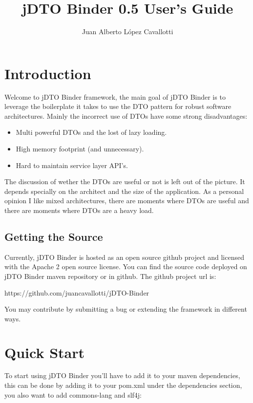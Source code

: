 \documentclass[11pt]{article}
\title{jDTO Binder 0.5 User's Guide}
\author{Juan Alberto López Cavallotti}
\newcommand{\JDTO}{jDTO Binder\xspace}
\begin{document}
\maketitle
\tableofcontents

\newpage
\section{Introduction}


Welcome to \JDTO framework, the main goal of \JDTO is to leverage the boilerplate it takes to use
the DTO pattern for robust software architectures. Mainly the incorrect use of DTOs have some strong
disadvantages: 

\begin{itemize}
\item Multi powerful DTOs and the lost of lazy loading.
\item High memory footprint (and unnecessary).
\item Hard to maintain service layer API's.
\end{itemize}

The discussion of wether the DTOs are useful or not is left out of the picture. It depends specially on 
the architect and the size of the application. As a personal opinion I like mixed architectures, there are
moments where DTOs are useful and there are moments where DTOs are a heavy load.


\subsection{Getting the Source}

Currently, \JDTO is hosted as an open source github project and licensed with the Apache 2 open source license. You can find the source code deployed on \JDTO maven repository or in github. The github project url is: 

https://github.com/juancavallotti/jDTO-Binder

You may contribute by submitting a bug or extending the framework in different ways.

\section{Quick Start}


To start using \JDTO you'll have to add it to your maven dependencies, this can be done
by adding it to your pom.xml under the dependencies section, you also want to add commons-lang and slf4j:
\end{document}
